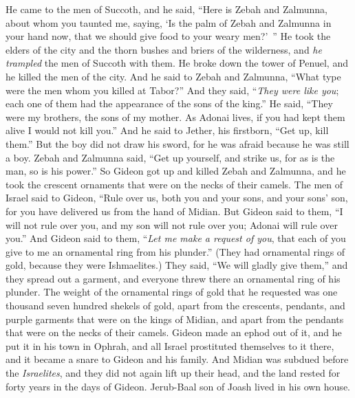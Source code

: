 \begin{biblechapter}
\verse He came to the men of Succoth, and he said, “Here is Zebah and Zalmunna, about whom you taunted me, saying, ‘Is the palm of Zebah and Zalmunna in your hand now, that we should give food to your weary men?’ ”
\verse He took the elders of the city and the thorn bushes and briers of the wilderness, and \textit{he trampled} the men of Succoth with them.
\verse He broke down the tower of Penuel, and he killed the men of the city.
\verse And he said to Zebah and Zalmunna, “What type were the men whom you killed at Tabor?” And they said, “\textit{They were like you}; each one of them had the appearance of the sons of the king.”
\verse He said, “They were my brothers, the sons of my mother. As Adonai lives, if you had kept them alive I would not kill you.”
\verse And he said to Jether, his firstborn, “Get up, kill them.” But the boy did not draw his sword, for he was afraid because he was still a boy.
\verse Zebah and Zalmunna said, “Get up yourself, and strike us, for as is the man, so is his power.” So Gideon got up and killed Zebah and Zalmunna, and he took the crescent ornaments that were on the necks of their camels.
\verse The men of Israel said to Gideon, “Rule over us, both you and your sons, and your sons’ son, for you have delivered us from the hand of Midian.
\verse But Gideon said to them, “I will not rule over you, and my son will not rule over you; Adonai will rule over you.”
\verse And Gideon said to them, “\textit{Let me make a request of you}, that each of you give to me an ornamental ring from his plunder.” (They had ornamental rings of gold, because they were Ishmaelites.)
\verse They said, “We will gladly give them,” and they spread out a garment, and everyone threw there an ornamental ring of his plunder.
\verse The weight of the ornamental rings of gold that he requested was one thousand seven hundred shekels of gold, apart from the crescents, pendants, and purple garments that were on the kings of Midian, and apart from the pendants that were on the necks of their camels.
\verse Gideon made an ephod out of it, and he put it in his town in Ophrah, and all Israel prostituted themselves to it there, and it became a snare to Gideon and his family.
\verse And Midian was subdued before the \textit{Israelites}, and they did not again lift up their head, and the land rested for forty years in the days of Gideon.
 Jerub-Baal son of Joash lived in his own house.

\end{biblechapter}
